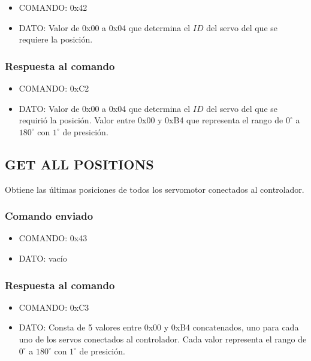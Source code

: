 \documentclass[a4paper,10pt]{article}
\begin{document}
\begin{itemize}
	\item{COMANDO:} 0x42
	\item{DATO:} Valor de 0x00 a 0x04 que determina el $ID$ del servo del que se requiere la posici\'on.
\end{itemize}

\subsubsection*{Respuesta al comando}

\begin{itemize}
	\item{COMANDO:} 0xC2
	\item{DATO:} Valor de 0x00 a 0x04 que determina el $ID$ del servo del que se requiri\'o la posici\'on.
	Valor entre 0x00 y 0xB4 que representa el rango de $0^{\circ}$ a $180^{\circ}$ con $1^{\circ}$ de presici\'on.
\end{itemize}

\subsection{GET ALL POSITIONS}
\label{get_all_positions}

Obtiene las \'ultimas posiciones de todos los servomotor conectados al controlador.

\subsubsection*{Comando enviado}

\begin{itemize}
	\item{COMANDO:} 0x43
	\item{DATO:} vac\'io
\end{itemize}

\subsubsection*{Respuesta al comando}

\begin{itemize}
	\item{COMANDO:} 0xC3
	\item{DATO:} Consta de 5 valores entre 0x00 y 0xB4 concatenados, uno para cada uno de los servos conectados al controlador.
	Cada valor representa el rango de $0^{\circ}$ a $180^{\circ}$ con $1^{\circ}$ de presici\'on.
\end{itemize}
\end{document}
